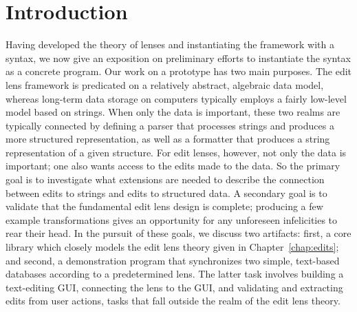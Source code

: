 \section{Introduction}
\label{sec:impl-intro}
Having developed the theory of lenses and instantiating the framework with a
syntax, we now give an exposition on preliminary efforts to instantiate the
syntax as a concrete program. Our work on a prototype has two main purposes.
The edit lens framework is predicated on a relatively abstract, algebraic
data model, whereas long-term data storage on computers typically employs a
fairly low-level model based on strings. When only the data is important,
these two realms are typically connected by defining a parser that processes
strings and produces a more structured representation, as well as a formatter
that produces a string representation of a given structure. For edit
lenses, however, not only the data is important; one also wants access to
the edits made to the data. So the primary goal is to investigate what
extensions are needed to describe the connection between edits to
strings and edits to structured data. A secondary goal is to validate that
the fundamental edit lens design is complete; producing a few example
transformations gives an opportunity for any unforeseen infelicities to rear
their head. In the pursuit of these goals, we discuss two artifacts: first,
a core library which closely models the edit lens theory given in
Chapter~\ref{chap:edits}; and second, a demonstration program that
synchronizes two simple, text-based databases according to a predetermined
lens. The latter task involves building a text-editing GUI, connecting the
lens to the GUI, and validating and extracting edits from user actions,
tasks that fall outside the realm of the edit lens theory.

